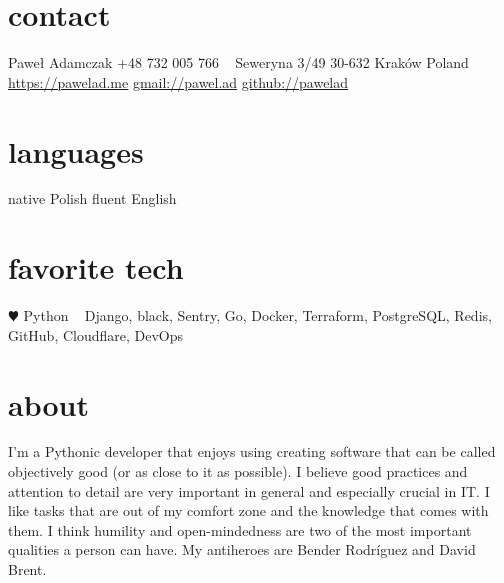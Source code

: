 \documentclass[]{cv-style}          %
\begin{document}
\lastupdated


\begin{aside}
%
\section{contact}
Paweł Adamczak
+48 732 005 766
~
Seweryna 3/49
30-632 Kraków
Poland
~
\href{https://pawelad.me/}{https://pawelad.me}
\href{mailto:pawel.ad@gmail.com}{gmail://pawel.ad}
\href{https://www.github.com/pawelad}{github://pawelad}
%
\section{languages}
native Polish
fluent English
%
\section{favorite tech}
{\color{red} $\varheartsuit$} Python
~
Django, black, Sentry, Go, Docker, Terraform, PostgreSQL, Redis, GitHub, Cloudflare, DevOps
\end{aside}


\section{about}
  \vspace{-0.3cm}

I'm a Pythonic developer that enjoys using  creating software that can be called objectively good (or as close to it as possible). I believe good practices and attention to detail are very important in general and especially crucial in IT. I like tasks that are out of my comfort zone and the knowledge that comes with them. I think humility and open-mindedness are two of the most important qualities a person can have. My antiheroes are Bender Rodríguez and David Brent.

\end{document}
